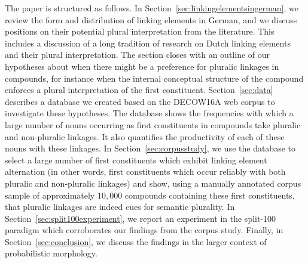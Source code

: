 The paper is structured as follows.
In Section~\ref{sec:linkingelementsingerman}, we review the form and distribution of linking elements in German, and we discuss positions on their potential plural interpretation from the literature.
This includes a discussion of a long tradition of research on Dutch linking elements and their plural interpretation.
The section closes with an outline of our hypotheses about when there might be a preference for pluralic linkages in compounds, for instance when the internal conceptual structure of the compound enforces a plural interpretation of the first constituent.
Section~\ref{sec:data} describes a database we created based on the DECOW16A web corpus to investigate these hypotheses.
The database shows the frequencies with which a large number of nouns occurring as first constituents in compounds take pluralic and non-pluralic linkages.
It also quantifies the productivity of each of these nouns with these linkages.
In Section~\ref{sec:corpusstudy}, we use the database to select a large number of first constituents which exhibit linking element alternation (in other words, first constituents which occur reliably with both pluralic and non-pluralic linkages) and show, using a manually annotated corpus sample of approximately $10,000$ compounds containing these first constituents, that pluralic linkages are indeed cues for semantic plurality.
In Section~\ref{sec:split100experiment}, we report an experiment in the split-100 paradigm which corroborates our findings from the corpus study.
Finally, in Section~\ref{sec:conclusion}, we discuss the findings in the larger context of probabilistic morphology.

